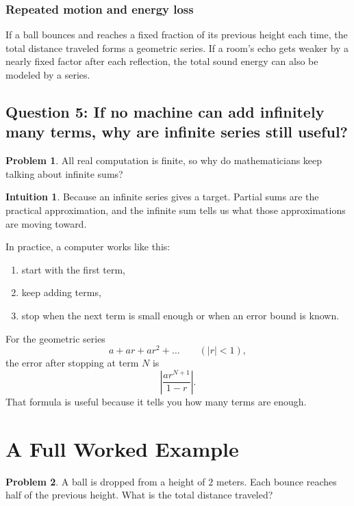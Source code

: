 \documentclass[11pt,a4paper]{article}
\theoremstyle{definition}
\newtheorem*{problem}{Problem}
\newtheorem*{intuition}{Intuition}
\theoremstyle{plain}
\begin{document}
\subsubsection*{Repeated motion and energy loss}

If a ball bounces and reaches a fixed fraction of its previous height each time, the total distance traveled forms a geometric series.
If a room's echo gets weaker by a nearly fixed factor after each reflection, the total sound energy can also be modeled by a series.

\subsection{Question 5: If no machine can add infinitely many terms, why are infinite series still useful?}

\begin{problem}
All real computation is finite, so why do mathematicians keep talking about infinite sums?
\end{problem}

\begin{intuition}
Because an infinite series gives a target.
Partial sums are the practical approximation, and the infinite sum tells us what those approximations are moving toward.
\end{intuition}

In practice, a computer works like this:
\begin{enumerate}
  \item start with the first term,
  \item keep adding terms,
  \item stop when the next term is small enough or when an error bound is known.
\end{enumerate}

For the geometric series
\[
a+ar+ar^2+\dots \qquad (|r|<1),
\]
the error after stopping at term \(N\) is
\[
\left|\frac{ar^{N+1}}{1-r}\right|.
\]
That formula is useful because it tells you how many terms are enough.

\section{A Full Worked Example}

\begin{problem}
A ball is dropped from a height of \(2\) meters.
Each bounce reaches half of the previous height.
What is the total distance traveled?
\end{problem}
\end{document}
